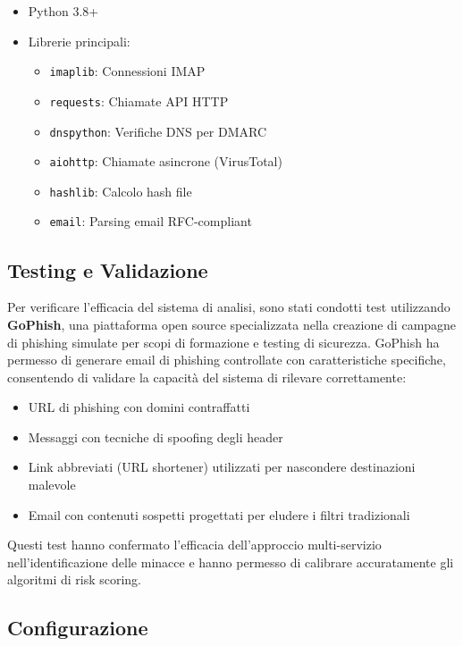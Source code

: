 \documentclass{article}
\begin{document}
\begin{itemize}
    \item Python 3.8+
    \item Librerie principali:
    \begin{itemize}
        \item \texttt{imaplib}: Connessioni IMAP
        \item \texttt{requests}: Chiamate API HTTP
        \item \texttt{dnspython}: Verifiche DNS per DMARC
        \item \texttt{aiohttp}: Chiamate asincrone (VirusTotal)
        \item \texttt{hashlib}: Calcolo hash file
        \item \texttt{email}: Parsing email RFC-compliant
    \end{itemize}
\end{itemize}

\subsection{Testing e Validazione}

Per verificare l'efficacia del sistema di analisi, sono stati condotti test utilizzando \textbf{GoPhish}, una piattaforma open source specializzata nella creazione di campagne di phishing simulate per scopi di formazione e testing di sicurezza. GoPhish ha permesso di generare email di phishing controllate con caratteristiche specifiche, consentendo di validare la capacità del sistema di rilevare correttamente:

\begin{itemize}
    \item URL di phishing con domini contraffatti
    \item Messaggi con tecniche di spoofing degli header
    \item Link abbreviati (URL shortener) utilizzati per nascondere destinazioni malevole
    \item Email con contenuti sospetti progettati per eludere i filtri tradizionali
\end{itemize}

Questi test hanno confermato l'efficacia dell'approccio multi-servizio nell'identificazione delle minacce e hanno permesso di calibrare accuratamente gli algoritmi di risk scoring.

\subsection{Configurazione}
\end{document}
